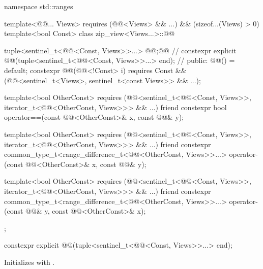 %
\begin{codeblock}
namespace std::ranges {
  template<@@... Views>
    requires (@@<Views> && ...) && (sizeof...(Views) > 0)
  template<bool Const>
  class zip_view<Views...>::@@ {
    tuple<sentinel_t<@@<Const, Views>>...> @@;@\itcorr[-1]@               // \expos
    constexpr explicit @@(tuple<sentinel_t<@@<Const, Views>>...> end);
                                                                                // \expos
  public:
    @@() = default;
    constexpr @@(@@<!Const> i)
      requires Const && (@@<sentinel_t<Views>, sentinel_t<const Views>> && ...);

    template<bool OtherConst>
      requires (@@<sentinel_t<@@<Const, Views>>,
                             iterator_t<@@<OtherConst, Views>>> && ...)
    friend constexpr bool operator==(const @@<OtherConst>& x, const @@& y);

    template<bool OtherConst>
      requires (@@<sentinel_t<@@<Const, Views>>,
                                   iterator_t<@@<OtherConst, Views>>> && ...)
    friend constexpr common_type_t<range_difference_t<@@<OtherConst, Views>>...>
      operator-(const @@<OtherConst>& x, const @@& y);

    template<bool OtherConst>
      requires (@@<sentinel_t<@@<Const, Views>>,
                                   iterator_t<@@<OtherConst, Views>>> && ...)
    friend constexpr common_type_t<range_difference_t<@@<OtherConst, Views>>...>
      operator-(const @@& y, const @@<OtherConst>& x);
  };
}
\end{codeblock}

%
\begin{itemdecl}
constexpr explicit @@(tuple<sentinel_t<@@<Const, Views>>...> end);
\end{itemdecl}

\begin{itemdescr}
\pnum
\effects
Initializes  with .
\end{itemdescr}

